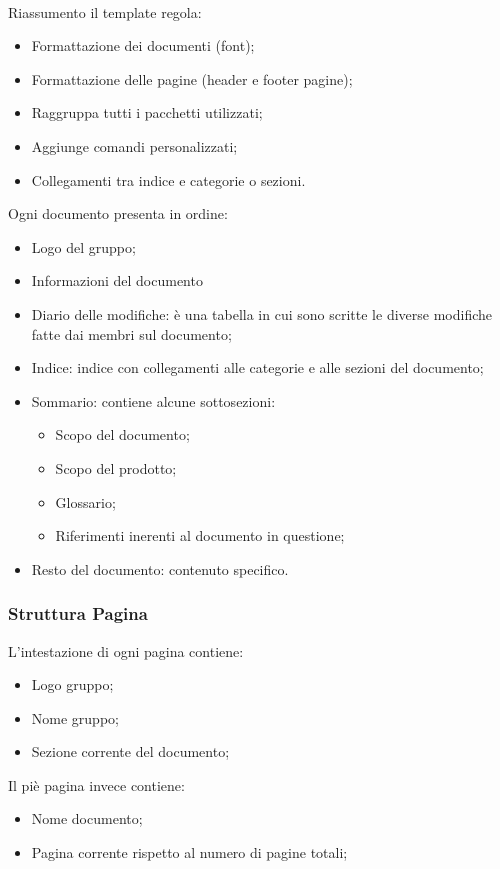 \documentclass{scalatekids-article}
\begin{document}
\\ Riassumento il template regola:
\begin{itemize}
\item Formattazione dei documenti (font);
\item Formattazione delle pagine (header e footer pagine);
\item Raggruppa tutti i pacchetti utilizzati;
\item Aggiunge comandi personalizzati;
\item Collegamenti tra indice e categorie o sezioni.
\end{itemize}
Ogni documento presenta in ordine:
\begin{itemize}
\item Logo del gruppo;
\item Informazioni del documento
\item Diario delle modifiche: è una tabella in cui sono scritte le diverse modifiche fatte dai membri sul documento;
\item Indice: indice con collegamenti alle categorie e alle sezioni del documento;
\item Sommario: contiene alcune sottosezioni:
  \begin{itemize}
  \item Scopo del documento;
  \item Scopo del prodotto;
  \item Glossario;
  \item Riferimenti inerenti al documento in questione;
  \end{itemize}
\item Resto del documento: contenuto specifico.
\end{itemize}

\subsubsection{Struttura Pagina}
L'intestazione di ogni pagina contiene:
\begin{itemize}
\item Logo gruppo;
\item Nome gruppo;
\item Sezione corrente del documento;
\end{itemize}
Il piè pagina invece contiene:
\begin{itemize}
\item Nome documento;
\item Pagina corrente rispetto al numero di pagine totali;
\end{itemize}
\end{document}
